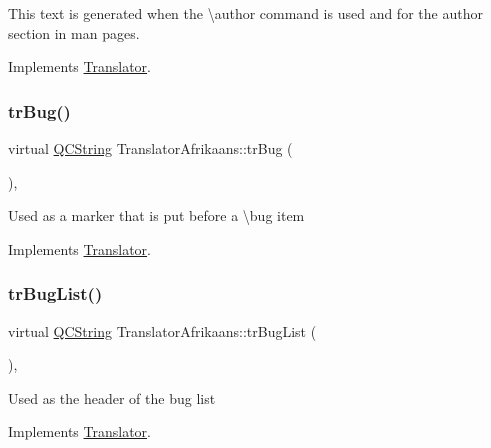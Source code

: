 This text is generated when the \textbackslash{}author command is used and for the author section in man pages. 

Implements \mbox{\hyperlink{class_translator}{Translator}}.

\mbox{\label{class_translator_afrikaans_a52de4d6bbbee02101e1e0126ab671339}} 
\subsubsection{\texorpdfstring{trBug()}{trBug()}}
{\footnotesize\ttfamily virtual \mbox{\hyperlink{class_q_c_string}{Q\+C\+String}} Translator\+Afrikaans\+::tr\+Bug (\begin{DoxyParamCaption}{ }\end{DoxyParamCaption})\hspace{0.3cm}{\ttfamily [inline]}, {\ttfamily [virtual]}}

Used as a marker that is put before a \textbackslash{}bug item 

Implements \mbox{\hyperlink{class_translator}{Translator}}.

\mbox{\label{class_translator_afrikaans_a19dafd2826b0ee78e691c479dc8219c7}} 
\subsubsection{\texorpdfstring{trBugList()}{trBugList()}}
{\footnotesize\ttfamily virtual \mbox{\hyperlink{class_q_c_string}{Q\+C\+String}} Translator\+Afrikaans\+::tr\+Bug\+List (\begin{DoxyParamCaption}{ }\end{DoxyParamCaption})\hspace{0.3cm}{\ttfamily [inline]}, {\ttfamily [virtual]}}

Used as the header of the bug list 

Implements \mbox{\hyperlink{class_translator}{Translator}}.

\mbox{\label{class_translator_afrikaans_a62fbe2cd0e6e9779f72c4c250f4ee0ca}} 
